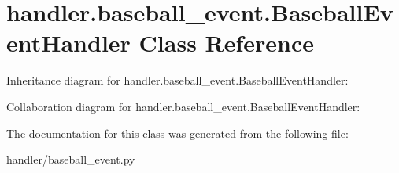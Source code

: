 \hypertarget{classhandler_1_1baseball__event_1_1_baseball_event_handler}{}\section{handler.\+baseball\+\_\+event.\+Baseball\+Event\+Handler Class Reference}
\label{classhandler_1_1baseball__event_1_1_baseball_event_handler}


Inheritance diagram for handler.\+baseball\+\_\+event.\+Baseball\+Event\+Handler\+:


Collaboration diagram for handler.\+baseball\+\_\+event.\+Baseball\+Event\+Handler\+:


The documentation for this class was generated from the following file\+:\begin{DoxyCompactItemize}
\item 
handler/baseball\+\_\+event.\+py\end{DoxyCompactItemize}
